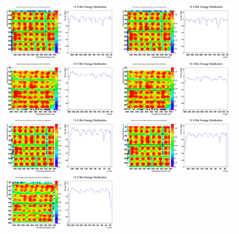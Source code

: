 \documentclass[hidelinks,11pt]{article}
\numberwithin{figure}{section}
\numberwithin{table}{section}
\begin{document}
\begin{figure}[hbtp]
\begin{center}
\includegraphics[width=0.45\textwidth]{Plots/2018/3rd/CombY5.png}
\includegraphics[width=0.45\textwidth]{Plots/2018/3rd/CombY6.png}
\includegraphics[width=0.45\textwidth]{Plots/2018/4th/CombY5.png}
\includegraphics[width=0.45\textwidth]{Plots/2018/4th/CombY6.png}
\includegraphics[width=0.45\textwidth]{Plots/2018/5th/CombY4.png}
\includegraphics[width=0.45\textwidth]{Plots/2018/5th/CombY5.png}
\includegraphics[width=0.45\textwidth]{Plots/2018/6th/CombY5.png}

\end{center}
\end{figure}
\end{document}
